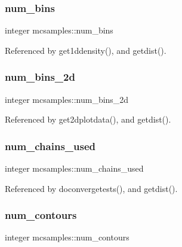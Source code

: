 \subsubsection{\texorpdfstring{num\+\_\+bins}{num\_bins}}
{\footnotesize\ttfamily integer mcsamples\+::num\+\_\+bins}



Referenced by get1ddensity(), and getdist().

\mbox{\label{namespacemcsamples_a2adeb191d79be31ecfbaafc674ada8d1}} 
\subsubsection{\texorpdfstring{num\+\_\+bins\+\_\+2d}{num\_bins\_2d}}
{\footnotesize\ttfamily integer mcsamples\+::num\+\_\+bins\+\_\+2d}



Referenced by get2dplotdata(), and getdist().

\mbox{\label{namespacemcsamples_a19f7c9315f7bf1a0fdcc248d0e9b9757}} 
\subsubsection{\texorpdfstring{num\+\_\+chains\+\_\+used}{num\_chains\_used}}
{\footnotesize\ttfamily integer mcsamples\+::num\+\_\+chains\+\_\+used}



Referenced by doconvergetests(), and getdist().

\mbox{\label{namespacemcsamples_adb5eb76b1f11b911bf9e72be639d5226}} 
\subsubsection{\texorpdfstring{num\+\_\+contours}{num\_contours}}
{\footnotesize\ttfamily integer mcsamples\+::num\+\_\+contours}



